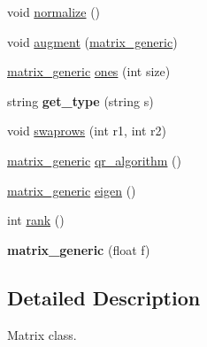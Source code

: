\begin{DoxyCompactItemize}
\item 
void \hyperlink{classmatrix__generic_aa77c12f86e18f3eda31e58054ac4e3f0}{normalize} ()
\item 
void \hyperlink{classmatrix__generic_abdfb50b45c340fe4b5f48c569c8f5428}{augment} (\hyperlink{classmatrix__generic}{matrix\-\_\-generic})
\item 
\hyperlink{classmatrix__generic}{matrix\-\_\-generic} \hyperlink{classmatrix__generic_ac714c0ea75c1effe0f1f55edcc112a73}{ones} (int size)
\item 
\hypertarget{classmatrix__generic_a988519a5ca08be7dca985d682b56a4dc}{string {\bfseries get\-\_\-type} (string s)}\label{classmatrix__generic_a988519a5ca08be7dca985d682b56a4dc}

\item 
void \hyperlink{classmatrix__generic_a79d7d011cb15c4321bd16b5830879db4}{swaprows} (int r1, int r2)
\item 
\hyperlink{classmatrix__generic}{matrix\-\_\-generic} \hyperlink{classmatrix__generic_a217dc9d9cd3c6841d1c235a9f2bff20f}{qr\-\_\-algorithm} ()
\item 
\hyperlink{classmatrix__generic}{matrix\-\_\-generic} \hyperlink{classmatrix__generic_aa1373338e0c0b4ab018312383971067d}{eigen} ()
\item 
int \hyperlink{classmatrix__generic_a40e95807065d76e0f47fb835941222dd}{rank} ()
\item 
\hypertarget{classmatrix__generic_a18b88ebe244323460e794a81c59f3b11}{{\bfseries matrix\-\_\-generic} (float f)}\label{classmatrix__generic_a18b88ebe244323460e794a81c59f3b11}

\end{DoxyCompactItemize}


\subsection{Detailed Description}
Matrix class. 

